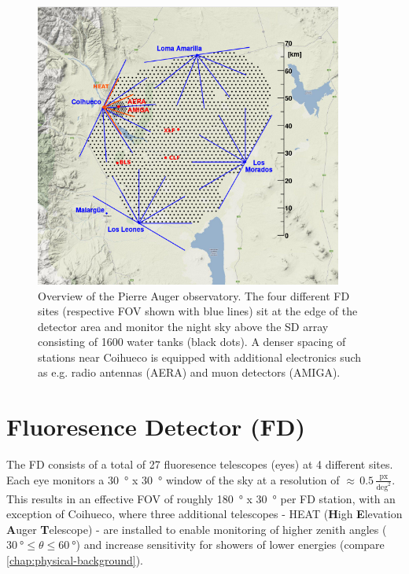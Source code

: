 \begin{figure}
	\centering
	\includegraphics[width=0.9\textwidth]{imgs/auger_array.png}
	\caption{Overview of the Pierre Auger observatory. The four different FD sites (respective FOV shown with blue lines) sit at the edge of
	the detector area and monitor the night sky above the SD array consisting of 1600 water tanks (black dots). A denser spacing of stations 
	near Coihueco is equipped with additional electronics such as e.g. radio antennas (AERA) and muon detectors (AMIGA).}
	\label{fig:auger-array}
\end{figure}

\section{Fluoresence Detector (FD)}
\label{sec:fluoresence-detector}

The FD consists of a total of 27 fluoresence telescopes (eyes) at 4 different sites. Each eye monitors a \SI{30}{\degree} x \SI{30}{\degree} window 
of the sky at a resolution of $\approx \, 0.5 \, \frac{ \text{px} }{ \text{deg}^2 }$. This results in an effective FOV of roughly \SI{180}{\degree} x 
\SI{30}{\degree} per FD station, with an exception of Coihueco, where three additional telescopes - HEAT (\textbf{H}igh \textbf{E}levation 
\textbf{A}uger \textbf{T}elescope) - are installed to enable monitoring of higher zenith angles ($\SI{30}{\degree}\leq\theta\leq\SI{60}{\degree}$) and
increase sensitivity for showers of lower energies (compare \autoref{chap:physical-background}).

